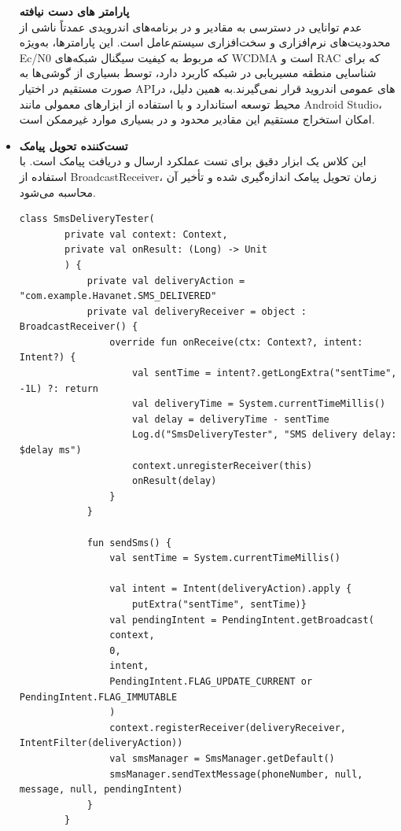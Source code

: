 \documentclass{report}
\begin{document}
\begin{itemize}
\begin{itemize}
	\end{itemize}
	\begin{note}
		\textbf{پارامتر های دست نیافته}\\
		عدم توانایی در دسترسی به مقادیر  و در برنامه‌های اندرویدی عمدتاً ناشی از محدودیت‌های نرم‌افزاری و سخت‌افزاری سیستم‌عامل است. این پارامترها، به‌ویژه Ec/N0 که مربوط به کیفیت سیگنال شبکه‌های WCDMA است و RAC که برای شناسایی منطقه مسیریابی در شبکه کاربرد دارد، توسط بسیاری از گوشی‌ها به صورت مستقیم در اختیار APIهای عمومی اندروید قرار نمی‌گیرند.به همین دلیل، در محیط توسعه استاندارد و با استفاده از ابزارهای معمولی مانند Android Studio، امکان استخراج مستقیم این مقادیر محدود و در بسیاری موارد غیرممکن است.
		
	\end{note}
	\item \textbf{تست‌کننده تحویل پیامک}\\
	این کلاس یک ابزار دقیق برای تست عملکرد ارسال و دریافت پیامک است. با استفاده از BroadcastReceiver، زمان تحویل پیامک اندازه‌گیری شده و تأخیر آن محاسبه می‌شود.
	
	\begin{lstlisting}[caption=SmsDeliveryTester.kt]
		class SmsDeliveryTester(
		private val context: Context,
		private val onResult: (Long) -> Unit
		) {
			private val deliveryAction = "com.example.Havanet.SMS_DELIVERED"
			private val deliveryReceiver = object : BroadcastReceiver() {
				override fun onReceive(ctx: Context?, intent: Intent?) {
					val sentTime = intent?.getLongExtra("sentTime", -1L) ?: return
					val deliveryTime = System.currentTimeMillis()
					val delay = deliveryTime - sentTime
					Log.d("SmsDeliveryTester", "SMS delivery delay: $delay ms")
					context.unregisterReceiver(this)
					onResult(delay)
				}
			}
			
			fun sendSms() {
				val sentTime = System.currentTimeMillis()
				
				val intent = Intent(deliveryAction).apply {
					putExtra("sentTime", sentTime)}
				val pendingIntent = PendingIntent.getBroadcast(
				context,
				0,
				intent,
				PendingIntent.FLAG_UPDATE_CURRENT or PendingIntent.FLAG_IMMUTABLE
				)
				context.registerReceiver(deliveryReceiver, IntentFilter(deliveryAction))
				val smsManager = SmsManager.getDefault()
				smsManager.sendTextMessage(phoneNumber, null, message, null, pendingIntent)
			}
		}
		
	\end{lstlisting}
	
\end{itemize}
\end{document}
